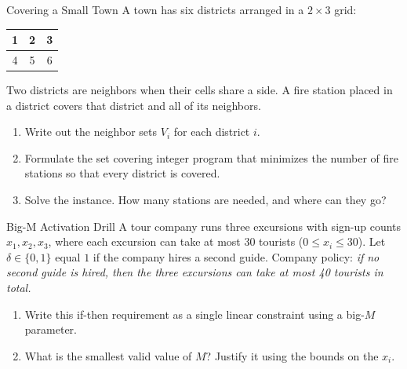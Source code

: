 \begin{ex}{Covering a Small Town}{}
\label{ex:fire-warmup}
 A town has six districts arranged in a $2 \times 3$ grid:
\begin{center}
\begin{tabular}{|c|c|c|}
\hline
1 & 2 & 3 \\
\hline
4 & 5 & 6 \\
\hline
\end{tabular}
\end{center}
Two districts are neighbors when their cells share a side.  A fire station placed in a district covers that district and all of its neighbors.
\begin{enumerate}
\item Write out the neighbor sets $V_i$ for each district $i$.
\item Formulate the set covering integer program that minimizes the number of fire stations so that every district is covered.
\item Solve the instance.  How many stations are needed, and where can they go?
\end{enumerate}
\end{ex}

\begin{ex}{Big-M Activation Drill}{}
\label{ex:bigM-drill}
 A tour company runs three excursions with sign-up counts $x_1, x_2, x_3$, where each excursion can take at most 30 tourists ($0 \leq x_i \leq 30$).  Let $\delta \in \{0,1\}$ equal $1$ if the company hires a second guide.  Company policy: \emph{if no second guide is hired, then the three excursions can take at most 40 tourists in total.}
\begin{enumerate}
\item Write this if-then requirement as a single linear constraint using a big-$M$ parameter.
\item What is the smallest valid value of $M$?  Justify it using the bounds on the $x_i$.
\end{enumerate}
\exrefs{\S\ref{subsec:big-M-activation}, \S\ref{sec:modeling-tricks}}
\end{ex}



